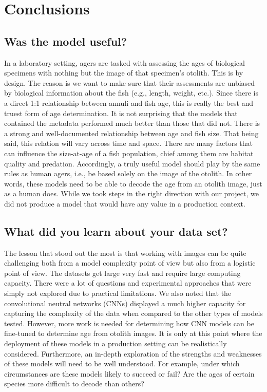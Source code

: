\section{Conclusions}

\subsection{Was the model useful?}

In a laboratory setting, agers are tasked with assessing the ages of biological specimens with nothing but the image of that specimen's otolith.
This is by design.
The reason is we want to make sure that their assessments are unbiased by biological information about the fish (e.g., length, weight, etc.).
Since there is a direct 1:1 relationship between annuli and fish age, this is really the best and truest form of age determination.
It is not surprising that the models that contained the metadata performed much better than those that did not.
There is a strong and well-documented relationship between age and fish size.
That being said, this relation will vary across time and space.
There are many factors that can influence the size-at-age of a fish population, chief among them are habitat quality and predation.
Accordingly, a truly useful model should play by the same rules as human agers, i.e., be based solely on the image of the otolith.
In other words, these models need to be able to decode the age from an otolith image, just as a human does.
While we took steps in the right direction with our project, we did not produce a model that would have any value in a production context.

\subsection{What did you learn about your data set?}

The lesson that stood out the most is that working with images can be quite challenging both from a model complexity point of view but also from a logistic point of view.
The datasets get large very fast and require large computing capacity.
There were a lot of questions and experimental approaches that were simply not explored due to practical limitations.
We also noted that the convolutional neutral networks (CNNs) displayed a much higher capacity for capturing the complexity of the data when compared to the other types of models tested.
However, more work is needed for determining how CNN models can be fine-tuned to determine age from otolith images.
It is only at this point where the deployment of these models in a production setting can be realistically considered.
Furthermore, an in-depth exploration of the strengths and weaknesses of these models will need to be well understood.
For example, under which circumstances are these models likely to succeed or fail?
Are the ages of certain species more difficult to decode than others?

